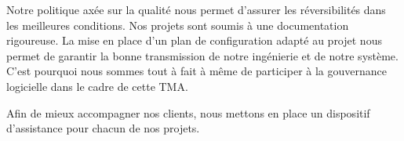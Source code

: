 	Notre politique axée sur la qualité nous permet d’assurer les réversibilités dans les meilleures conditions. Nos projets sont soumis à une documentation rigoureuse. La mise en place d’un plan de configuration adapté au projet nous permet de garantir la bonne transmission de notre ingénierie et de notre système. C’est pourquoi nous sommes tout à fait à même de participer à la gouvernance logicielle dans le cadre de cette TMA.
	
	Afin de mieux accompagner nos clients, nous mettons en place un dispositif d’assistance pour chacun de nos projets.
	\newpage
	
